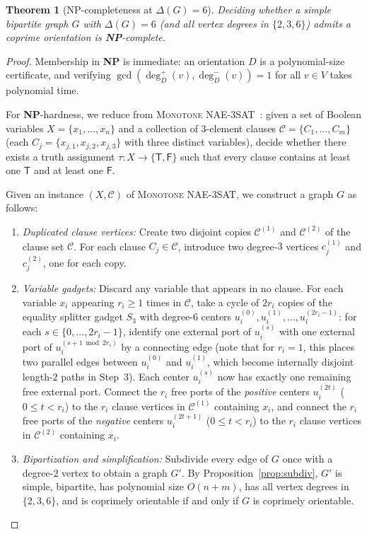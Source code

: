 \documentclass[11pt,a4paper]{article}
\newtheorem{theorem}{Theorem}[section]
\theoremstyle{definition}
\theoremstyle{remark}
\newcommand{\outdeg}{\deg^{+}}
\newcommand{\indeg}{\deg^{-}}
\begin{document}
\begin{theorem}[NP-completeness at $\Delta(G) = 6$]\label{thm:npc}
Deciding whether a simple bipartite graph $G$ with $\Delta(G) = 6$ (and all vertex degrees in $\{2, 3, 6\}$) admits a coprime orientation is \textbf{NP}-complete.
\end{theorem}

\begin{proof}
Membership in \textbf{NP} is immediate: an orientation $D$ is a polynomial-size certificate, and verifying $\gcd(\outdeg_D(v), \indeg_D(v)) = 1$ for all $v \in V$ takes polynomial time.

For \textbf{NP}-hardness, we reduce from \textsc{Monotone NAE-3SAT}~\cite{Schaefer1978}: given a set of Boolean variables $X = \{x_1, \dots, x_n\}$ and a collection of $3$-element clauses $\mathcal{C} = \{C_1, \dots, C_m\}$ (each $C_j = \{x_{j,1}, x_{j,2}, x_{j,3}\}$ with three distinct variables), decide whether there exists a truth assignment $\tau : X \to \{\mathsf{T}, \mathsf{F}\}$ such that every clause contains at least one $\mathsf{T}$ and at least one $\mathsf{F}$.

Given an instance $(X, \mathcal{C})$ of \textsc{Monotone NAE-3SAT}, we construct a graph $G$ as follows:
\begin{enumerate}[leftmargin=2em,itemsep=2pt]
  \item \emph{Duplicated clause vertices:} Create two disjoint copies $\mathcal{C}^{(1)}$ and $\mathcal{C}^{(2)}$ of the clause set $\mathcal{C}$. For each clause $C_j \in \mathcal{C}$, introduce two degree-$3$ vertices $c_j^{(1)}$ and $c_j^{(2)}$, one for each copy.
  \item \emph{Variable gadgets:} Discard any variable that appears in no clause. For each variable $x_i$ appearing $r_i \ge 1$ times in $\mathcal{C}$, take a cycle of $2 r_i$ copies of the equality splitter gadget $S_3$ with degree-$6$ centers $u_i^{(0)}, u_i^{(1)}, \dots, u_i^{(2r_i - 1)}$: for each $s \in \{0, \dots, 2r_i - 1\}$, identify one external port of $u_i^{(s)}$ with one external port of $u_i^{(s+1 \bmod 2r_i)}$ by a connecting edge (note that for $r_i = 1$, this places two parallel edges between $u_i^{(0)}$ and $u_i^{(1)}$, which become internally disjoint length-$2$ paths in Step~3). Each center $u_i^{(s)}$ now has exactly one remaining free external port. Connect the $r_i$ free ports of the \emph{positive} centers $u_i^{(2t)}$ ($0 \le t < r_i$) to the $r_i$ clause vertices in $\mathcal{C}^{(1)}$ containing $x_i$, and connect the $r_i$ free ports of the \emph{negative} centers $u_i^{(2t+1)}$ ($0 \le t < r_i$) to the $r_i$ clause vertices in $\mathcal{C}^{(2)}$ containing $x_i$.
  \item \emph{Bipartization and simplification:} Subdivide every edge of $G$ once with a degree-$2$ vertex to obtain a graph $G'$. By Proposition~\ref{prop:subdiv}, $G'$ is simple, bipartite, has polynomial size $O(n + m)$, has all vertex degrees in $\{2, 3, 6\}$, and is coprimely orientable if and only if $G$ is coprimely orientable.
\end{enumerate}


\end{proof}
\end{document}

